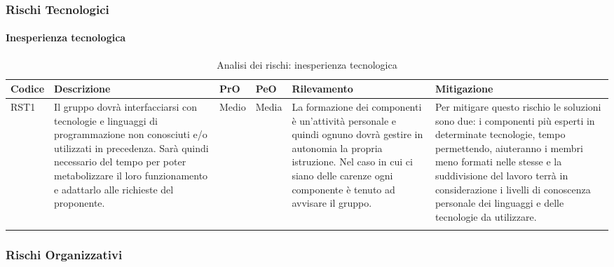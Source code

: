 \subsubsection{Rischi Tecnologici}
\paragraph{Inesperienza tecnologica}		
		\begin{center}
	\begin{longtable}{p{1cm}|p{4cm}|p{0.7cm}|p{0.7cm}|p{3cm}|p{4cm}}
		\arrayrulecolor{white}
		\hline
		\rowcolor{blue!20}
		\textbf{Codice} & 
		\textbf{Descrizione} &
		\textbf{PrO}  &
		\textbf{PeO}  &				        
		\textbf{Rilevamento} &
		\textbf{Mitigazione} \\
		\hline
		RST1 & Il gruppo dovrà interfacciarsi con tecnologie e linguaggi di programmazione non conosciuti e/o utilizzati in precedenza. Sarà quindi necessario del tempo per poter metabolizzare il loro funzionamento e adattarlo alle richieste del proponente. & Medio & Media & La formazione dei componenti è un'attività personale e quindi ognuno dovrà gestire in autonomia la propria istruzione. Nel caso in cui ci siano delle carenze ogni componente è tenuto ad avvisare il gruppo. & Per mitigare questo rischio le soluzioni sono due: i componenti più esperti in determinate tecnologie, tempo permettendo, aiuteranno i membri meno formati nelle stesse e la suddivisione del lavoro terrà in considerazione i livelli di conoscenza personale dei linguaggi e delle tecnologie da utilizzare. \\
		
		\caption{Analisi dei rischi: inesperienza tecnologica}
	\end{longtable}
\end{center}		
		
\subsubsection{Rischi Organizzativi}
